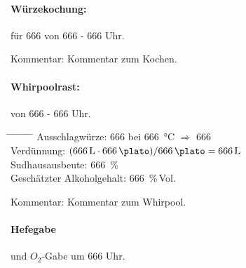 \documentclass[12pt,oneside,a4paper]{scrartcl}
\begin{document}
\pagebreak[3]
\paragraph{Würzekochung:} für \SI{666}{\Min} von 666 - 666 Uhr.
	\begin{adjustwidth}{2cm}{0cm}
		\hspace{-1cm}Kommentar: Kommentar zum Kochen.
	\end{adjustwidth}

\pagebreak[3]
\paragraph{Whirpoolrast:} von 666 - 666 Uhr.
	\begin{tabbing}
		\hspace{1cm} \= \hspace{1cm} \= \hspace{1cm} \= \hspace{1cm} \= \hspace{1cm} \= \hspace{1cm} \= \hspace{1cm} \= \hspace{1cm} \= \kill
		\>Ausschlagwürze: \> \> \> \> \>  \SI{666}{\plato} bei \SI{666}{\celsius} $\Rightarrow$ \SI{666}{\plato}\\
		\>Verdünnung: \> \> \> \> \> $(\SI{666}{\litre} \cdot \SI{666}{\plato}) / \SI{666}{\plato} = \SI{666}{\litre}$\\
		\>Sudhausausbeute: \> \> \> \> \> \SI{666}{\percent}\\
		\>Geschätzter Alkoholgehalt: \> \> \> \> \> \SI{666}{\percent}\,Vol.
	\end{tabbing}
	\begin{adjustwidth}{2cm}{0cm}
		\hspace{-1cm}Kommentar: Kommentar zum Whirpool.
	\end{adjustwidth}

\pagebreak[1]
\paragraph{Hefegabe} und $O_2$-Gabe um 666 Uhr.
\end{document}

